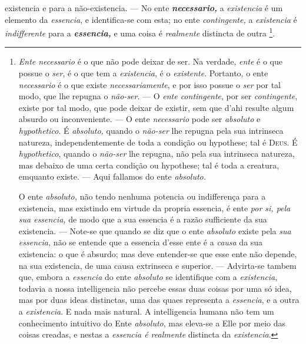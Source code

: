  existencia e para a não-existencia. --- No ente \textbf{\emph{necessario,}} a \emph{existencia} é um elemento da \emph{essencia}, e identifica-se com esta; no ente \emph{contingente,} a \emph{existencia} é \emph{indifferente} para a \textbf{\emph{essencia,}} e uma coisa é \emph{realmente} distincta de outra \footnote{\emph{Ente necessario} é o que não pode deixar de ser. Na verdade, \emph{ente} é o que possue o \emph{ser}, é o que tem a \emph{existencia}, é o \emph{existente}. Portanto, o ente \emph{necessario} é o que existe \emph{necessariamente}, e por isso possue o \emph{ser} por tal modo, que lhe repugna o \emph{não-ser}. --- O \emph{ente contingente}, por ser \emph{contingente}, existe por tal modo, que pode deixar de existir, sem que d'ahi resulte algum absurdo ou inconveniente. --- O ente \emph{necessario} pode ser \emph{absoluto} e \emph{hypothetico}. É \emph{absoluto,} quando o \emph{não-ser} lhe repugna pela sua intrinseca natureza, independentemente de toda a condição ou hypothese; tal é \textsc{Deus}. É \emph{hypothetico}, quando o \emph{não-ser} lhe repugna, não pela sua intrinseca natureza, mas debaixo de uma certa condição ou hypothese; tal é toda a creatura, emquanto existe. --- Aqui fallamos do ente \emph{absoluto.}\par O ente \emph{absoluto,} não tendo nenhuma potencia ou indifferença para a existencia, mas existindo em virtude da propria essencia, é ente \emph{por si, pela sua essencia,} de modo que a sua essencia é a razão sufficiente da sua existencia. --- Note-se que quando se diz que o ente \emph{absoluto} existe pela \emph{sua essencia,} não se entende que a essencia d'esse ente é a \emph{causa} da sua existencia: o que é absurdo; mas deve entender-se que esse ente não depende, na sua existencia, de uma causa extrinseca e superior. --- Advirta-se tambem que, embora a \emph{essencia} do ente \emph{absoluto} se identifique com a \emph{existencia}, todavia a nossa intelligencia não percebe essas duas coisas por uma só idea, mas por duas ideas distinctas, uma das quaes representa a \emph{essencia}, e a outra a \emph{existencia}. E nada mais natural. A intelligencia humana não tem um conhecimento intuitivo do Ente \emph{absoluto}, mas eleva-se a Elle por meio das coisas creadas, e nestas a \emph{essencia é realmente} distincta da \emph{existencia}.}.
